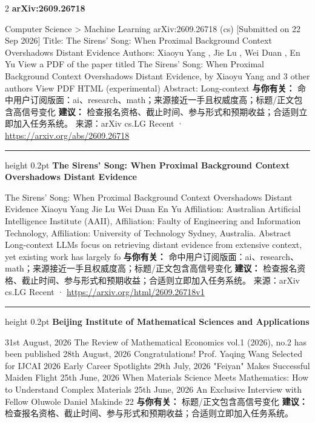 \documentclass[10.5pt]{ctexart}
\begin{document}
\begin{multicols}{2}
{\large\bfseries arXiv:2609.26718}\par
Computer Science > Machine Learning arXiv:2609.26718 (cs) [Submitted on 22 Sep 2026] Title: The Sirens' Song: When Proximal Background Context Overshadows Distant Evidence Authors: Xiaoyu Yang , Jie Lu , Wei Duan , En Yu View a PDF of the paper titled The Sirens' Song: When Proximal Background Context Overshadows Distant Evidence, by Xiaoyu Yang and 3 other authors View PDF HTML (experimental) Abstract: Long-context 
\textbf{与你有关：} 命中用户订阅版面：ai、research、math；来源接近一手且权威度高；标题/正文包含高信号变化
\textbf{建议：} 检查报名资格、截止时间、参与形式和预期收益；合适则立即加入任务系统。
{\footnotesize\color{ormuted} 来源：arXiv cs.LG Recent · \url{https://arxiv.org/abs/2609.26718}}
\vspace{2mm}
\hrule height 0.2pt
\vspace{2mm}
{\large\bfseries The Sirens’ Song: When Proximal Background Context Overshadows Distant Evidence}\par
The Sirens’ Song: When Proximal Background Context Overshadows Distant Evidence Xiaoyu Yang Jie Lu Wei Duan En Yu Affiliation: Australian Artificial Intelligence Institute (AAII), Affiliation: Faulty of Engineering and Information Technology, Affiliation: University of Technology Sydney, Australia. Abstract Long-context LLMs focus on retrieving distant evidence from extensive context, yet existing work has largely fo
\textbf{与你有关：} 命中用户订阅版面：ai、research、math；来源接近一手且权威度高；标题/正文包含高信号变化
\textbf{建议：} 检查报名资格、截止时间、参与形式和预期收益；合适则立即加入任务系统。
{\footnotesize\color{ormuted} 来源：arXiv cs.LG Recent · \url{https://arxiv.org/html/2609.26718v1}}
\vspace{2mm}
\hrule height 0.2pt
\vspace{2mm}
{\large\bfseries Beijing Institute of Mathematical Sciences and Applications}\par
31st August, 2026 The Review of Mathematical Economics vol.1 (2026), no.2 has been published 28th August, 2026 Congratulations! Prof. Yaqing Wang Selected for IJCAI 2026 Early Career Spotlights 29th July, 2026 "Feiyan" Makes Successful Maiden Flight 25th June, 2026 When Materials Science Meets Mathematics: How to Understand Complex Materials 25th June, 2026 An Exclusive Interview with Fellow Oluwole Daniel Makinde 22
\textbf{与你有关：} 标题/正文包含高信号变化
\textbf{建议：} 检查报名资格、截止时间、参与形式和预期收益；合适则立即加入任务系统。

\end{multicols}
\end{document}
